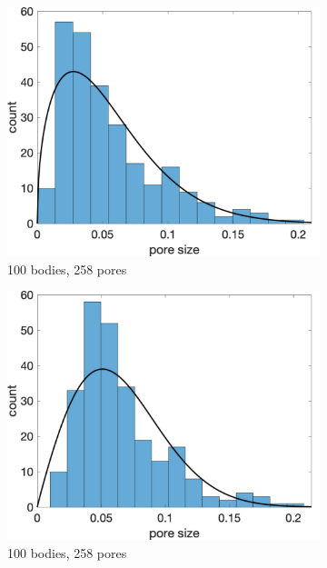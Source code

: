 \documentclass{jfm}
\begin{document}
\begin{figure}
\begin{subfigure}[b]{0.33\textwidth}
\includegraphics*[width =\linewidth]{./figs/hist100b_1}
\caption{100 bodies, 258 pores}
\end{subfigure}%
\begin{subfigure}[b]{0.33\textwidth}
\includegraphics*[width =\linewidth]{./figs/hist100b_46}
\caption{100 bodies, 258 pores}
\end{subfigure}%
\begin{subfigure}[b]{0.33\textwidth}

\end{subfigure}
\end{figure}
\end{document}
